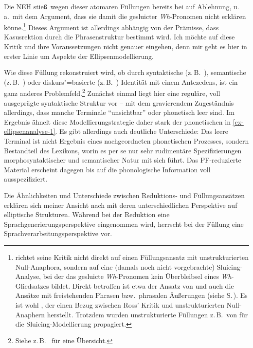 Die NEH stie\ss\ wegen dieser atomaren Füllungen bereits bei \cite{Ross:69} auf Ablehnung, u.\,a.\ mit dem Argument, dass sie damit die  gesluicter \textit{Wh}-Pronomen nicht erklären könne.\footnote{\cite{Ross:69} richtet seine Kritik nicht direkt auf einen Füllungsansatz mit unstrukturierten Null-Anaphora, sondern auf eine (damals noch nicht vorgebrachte) Sluicing-Analyse, bei der das gesluicte \textit{Wh}-Pronomen kein Überbleibsel eines \textit{Wh}-Gliedsatzes bildet. Direkt betroffen ist etwa der Ansatz von \cite{Riemsdijk:78} und auch die Ansätze mit freistehenden Phrasen bzw.\ phrasalen Äu\ss erungen (siehe S.\,\pageref{ex-freistehende-phrasen}). Es ist wohl \cite{Wasow:72}, der einen Bezug zwischen Ross' Kritik und unstrukturierten Null-Anaphern herstellt. Trotzdem wurden unstrukturierte Füllungen z.\,B.\ von \cite{Chung:etal:95} für die Sluicing-Modellierung propagiert. } Dieses Argument ist allerdings abhängig von der Prämisse, dass Kasusrektion durch die Phrasenstruktur bestimmt wird. Ich möchte auf diese Kritik und ihre Voraussetzungen nicht genauer eingehen, denn mir geht es hier in erster Linie um Aspekte der Ellipsenmodellierung. 
 
Wie diese Füllung rekonstruiert wird, ob durch syntaktische (z.\,B.\ \citealt{Fiengo:May:94,Chung:etal:95}), semantische (z.\,B.\ \citealt{Dalrymple:etal:91}) oder diskurs"=basierte (z.\,B.\ \citealt{Hardt:93,Hardt:99,Hardt:Romero:04}) Identität mit einem Antezedens, ist ein ganz anderes Problemfeld.\footnote{Siehe z.\,B.\ \citet[Kapitel~3]{Schlangen:03} für eine Übersicht.} Zunächst einmal liegt hier eine reguläre, voll ausgeprägte syntaktische Struktur vor -- mit dem gravierendem Zugeständnis allerdings, dass manche Terminale "`unsichtbar"' oder phonetisch leer sind. Im Ergebnis ähnelt diese Modellierungstrategie daher stark der phonetischen  in \ref{ex-ellipsenanalyse-1}. Es gibt allerdings auch deutliche Unterschiede: Das leere Terminal ist nicht Ergebnis eines nachgeordneten phonetischen Prozesses, sondern Bestandteil des Lexikons, worin es per se nur sehr rudimentäre Spezifizierungen morphosyntaktischer und semantischer Natur mit sich führt. Das PF-reduzierte Material erscheint dagegen bis auf die phonologische Information voll ausspezifiziert. 

Die Ähnlichkeiten und Unterschiede zwischen Reduktions- und Füllungsansätzen erklären sich meiner Ansicht nach mit deren unterschiedlichen Perspektive auf elliptische Strukturen. Während bei der Reduktion eine Sprachgenerierungsperspektive eingenommen wird, herrscht bei der Füllung eine Sprachverarbeitungsperspektive vor.

